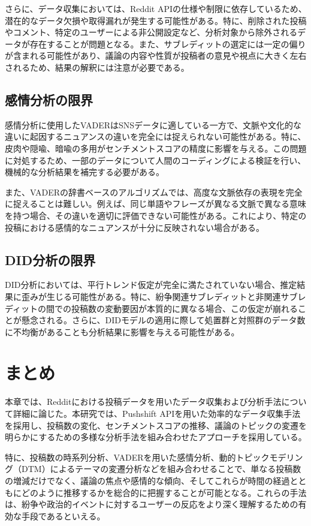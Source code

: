 \documentclass[11pt, a4j]{jreport}
\begin{document}
    さらに、データ収集においては、Reddit APIの仕様や制限に依存しているため、潜在的なデータ欠損や取得漏れが発生する可能性がある。特に、削除された投稿やコメント、特定のユーザーによる非公開設定など、分析対象から除外されるデータが存在することが問題となる。また、サブレディットの選定には一定の偏りが含まれる可能性があり、議論の内容や性質が投稿者の意見や視点に大きく左右されるため、結果の解釈には注意が必要である。
    
    \subsection{感情分析の限界}
    感情分析に使用したVADERはSNSデータに適している一方で、文脈や文化的な違いに起因するニュアンスの違いを完全には捉えられない可能性がある。特に、皮肉や隠喩、暗喩の多用がセンチメントスコアの精度に影響を与える。この問題に対処するため、一部のデータについて人間のコーディングによる検証を行い、機械的な分析結果を補完する必要がある。
    
    また、VADERの辞書ベースのアルゴリズムでは、高度な文脈依存の表現を完全に捉えることは難しい。例えば、同じ単語やフレーズが異なる文脈で異なる意味を持つ場合、その違いを適切に評価できない可能性がある。これにより、特定の投稿における感情的なニュアンスが十分に反映されない場合がある。
    
    \subsection{DID分析の限界}
    DID分析においては、平行トレンド仮定が完全に満たされていない場合、推定結果に歪みが生じる可能性がある。特に、紛争関連サブレディットと非関連サブレディットの間での投稿数の変動要因が本質的に異なる場合、この仮定が崩れることが懸念される。さらに、DIDモデルの適用に際して処置群と対照群のデータ数に不均衡があることも分析結果に影響を与える可能性がある。

    \section{まとめ}
    本章では、Redditにおける投稿データを用いたデータ収集および分析手法について詳細に論じた。本研究では、Pushshift APIを用いた効率的なデータ収集手法を採用し、投稿数の変化、センチメントスコアの推移、議論のトピックの変遷を明らかにするための多様な分析手法を組み合わせたアプローチを採用している。

    特に、投稿数の時系列分析、VADERを用いた感情分析、動的トピックモデリング（DTM）によるテーマの変遷分析などを組み合わせることで、単なる投稿数の増減だけでなく、議論の焦点や感情的な傾向、そしてこれらが時間の経過とともにどのように推移するかを総合的に把握することが可能となる。これらの手法は、紛争や政治的イベントに対するユーザーの反応をより深く理解するための有効な手段であるといえる。
\end{document}
